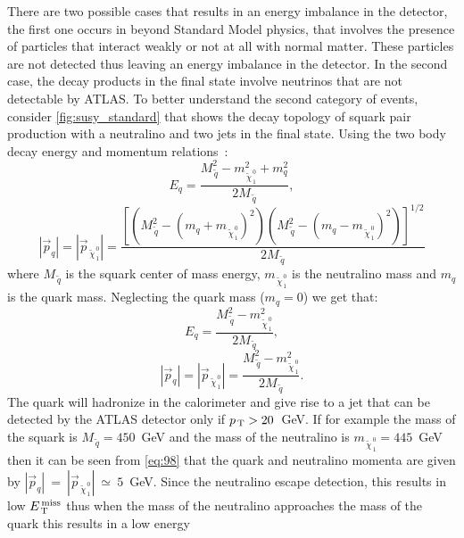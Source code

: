 There are two possible cases that results in an energy imbalance in the
detector, the first one occurs in beyond Standard Model physics, that involves
the presence of particles that interact weakly or not at all with normal
matter. These particles are not detected thus leaving an energy imbalance in the
detector. In the second case, the decay products in the final state involve
neutrinos that are not detectable by ATLAS\@. To better understand the second
category of events, consider \cref{fig:susy_standard} that shows the decay
topology of squark pair production with a neutralino and two jets in the final
state. Using the two body decay energy and momentum relations~\cite{PDG}:
\begin{equation}
  \label{eq:95}
  E_q = \frac{M_{\, \tilde{q}}^2 - m_{\, \tilde{\chi}_{\, 1}^{\, 0}}^2 + m_q^2}{2
    M_{\, \tilde{q}}},
\end{equation}
\begin{equation}
  \label{eq:96}
  |\vec{p}_q| = |\vec{p}_{\, \tilde{\chi}_{\, 1}^{\, 0}}| = \frac{\left[ \left(
        M_{\, \tilde{q}}^2 - (m_q + m_{\, \tilde{\chi}_{\, 1}^{\, 0}})^2
      \right) \left( M_{\, \tilde{q}}^2 - (m_q - m_{\, \tilde{\chi}_{\, 1}^{\,
            0}})^2 \right) \right]^{1/2}}{2 M_{\, \tilde{q}}}
\end{equation}
where $M_{\, \tilde{q}}$ is the squark center of mass energy,
$m_{\, \tilde{\chi}_{\, 1}^{\, 0}}$ is the neutralino mass and $m_q$ is the
quark mass. Neglecting the quark mass ($m_q = 0$) we get that:
\begin{equation}
  \label{eq:97}
  E_q = \frac{M_{\, \tilde{q}}^2 - m_{\, \tilde{\chi}_{\, 1}^{\, 0}}^2}{2 M_{\,
      \tilde{q}}},
\end{equation}
\begin{equation}
  \label{eq:98}
  |\vec{p}_q| = |\vec{p}_{\, \tilde{\chi}_{\, 1}^{\, 0}}| = \frac{M_{\,
      \tilde{q}}^2 - m_{\, \tilde{\chi}_{\, 1}^{\, 0}}^2}{2 M_{\, \tilde{q}}}.
\end{equation}
The quark will hadronize in the calorimeter and give rise to a jet that can be
detected by the ATLAS detector only if $p_\mathrm{\, T} > 20$~GeV. If for example the mass
of the squark is $M_{\, \tilde{q}} = 450$~GeV and the mass of the neutralino is
$m_{\, \tilde{\chi}_{\, 1}^{\, 0}} = 445$~GeV then it can be seen from
\cref{eq:98} that the quark and neutralino momenta are given by
$|\vec{p}_q|~=~|\vec{p}_{\, \tilde{\chi}_{\, 1}^{\, 0}}|~\simeq~5$~GeV. Since
the neutralino escape detection, this results in low $E_\mathrm{\, T}^\mathrm{\, miss}$ thus when the mass
of the neutralino approaches the mass of the quark this results in a low energy
